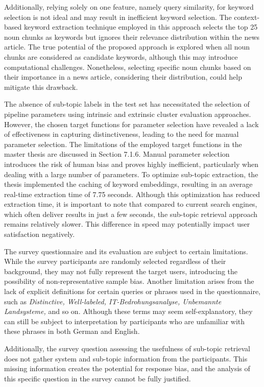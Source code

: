 Additionally, relying solely on one feature, namely query similarity, for keyword selection is not ideal and may result in inefficient keyword selection. The context-based keyword extraction technique employed in this approach selects the top 25 noun chunks as keywords but ignores their relevance distribution within the news article. The true potential of the proposed approach is explored when all noun chunks are considered as candidate keywords, although this may introduce computational challenges. Nonetheless, selecting specific noun chunks based on their importance in a news article, considering their distribution, could help mitigate this drawback.


The absence of sub-topic labels in the test set has necessitated the selection of pipeline parameters using intrinsic and extrinsic cluster evaluation approaches. However, the chosen target functions for parameter selection have revealed a lack of effectiveness in capturing distinctiveness, leading to the need for manual parameter selection. The limitations of the employed target functions in the master thesis are discussed in Section 7.1.6. Manual parameter selection introduces the risk of human bias and proves highly inefficient, particularly when dealing with a large number of parameters. To optimize sub-topic extraction, the thesis implemented the caching of keyword embeddings, resulting in an average real-time extraction time of 7.75 seconds. Although this optimization has reduced extraction time, it is important to note that compared to current search engines, which often deliver results in just a few seconds, the sub-topic retrieval approach remains relatively slower. This difference in speed may potentially impact user satisfaction negatively.

The survey questionnaire and its evaluation are subject to certain limitations. While the survey participants are randomly selected regardless of their background, they may not fully represent the target users, introducing the possibility of non-representative sample bias. Another limitation arises from the lack of explicit definitions for certain queries or phrases used in the questionnaire, such as \emph{Distinctive, Well-labeled, IT-Bedrohungsanalyse, Unbemannte Landsysteme,} and so on. Although these terms may seem self-explanatory, they can still be subject to interpretation by participants who are unfamiliar with these phrases in both German and English.

Additionally, the survey question assessing the usefulness of sub-topic retrieval does not gather system and sub-topic information from the participants. This missing information creates the potential for response bias, and the analysis of this specific question in the survey cannot be fully justified.


